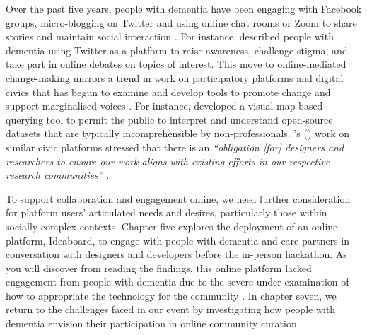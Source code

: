 Over the past five years, people with dementia have been engaging with Facebook groups, micro-blogging on Twitter and using online chat rooms or Zoom to share stories and maintain social interaction \citep{lazar_safe_2019}. For instance, \cite{talbot_how_2020} described people with dementia using Twitter as a platform to raise awareness, challenge stigma, and take part in online debates on topics of interest. This move to online-mediated change-making mirrors a trend in work on participatory platforms and digital civics that has begun to examine and develop tools to promote change and support marginalised voices \citep{corbett_exploring_2018}. For instance, \cite{puussaar_making_2018} developed a visual map-based querying tool to permit the public to interpret and understand open-source datasets that are typically incomprehensible by non-professionals. \citeauthor{asad_tap_2017}'s (\citeyear{asad_tap_2017}) work on similar civic platforms stressed that there is an \textit{``obligation [for] designers and researchers to ensure our work aligns with existing efforts in our respective research communities'' \citep[pg. 6314]{asad_tap_2017}}.

To support collaboration and engagement online, we need further consideration for platform users’ articulated needs and desires, particularly those within socially complex contexts. Chapter five explores the deployment of an online platform, Ideaboard, to engage with people with dementia and care partners in conversation with designers and developers before the in-person hackathon. As you will discover from reading the findings, this online platform lacked engagement from people with dementia due to the severe under-examination of how to appropriate the technology for the community \citep{lindqvist2018contrasting}. In chapter seven, we return to the challenges faced in our event by investigating how people with dementia envision their participation in online community curation.

